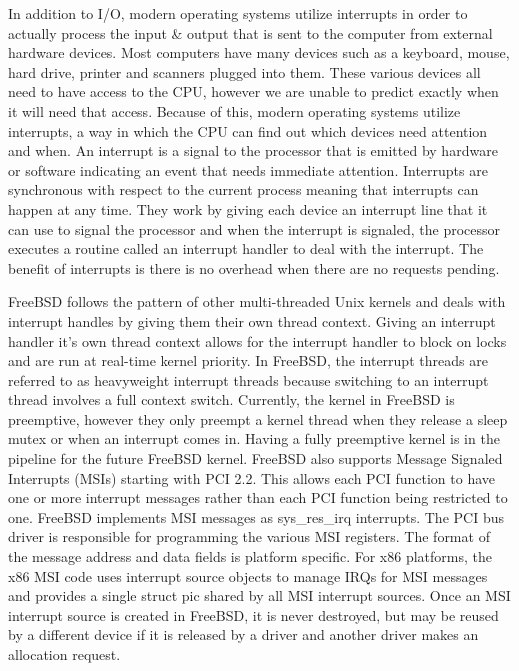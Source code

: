 \documentclass[letterpaper,10pt,draftclsnofoot,onecolumn,titlepage]{IEEEtran}
\begin{document}
	In addition to I/O, modern operating systems utilize interrupts in order to actually process the input \& output that is sent to the computer from external hardware devices.
	Most computers have many devices such as a keyboard, mouse, hard drive, printer and scanners plugged into them.
	These various devices all need to have access to the CPU, however we are unable to predict exactly when it will need that access.
	Because of this, modern operating systems utilize interrupts, a way in which the CPU can find out which devices need attention and when.
	An interrupt is a signal to the processor that is emitted by hardware or software indicating an event that needs immediate attention.
	Interrupts are synchronous with respect to the current process meaning that interrupts can happen at any time.
	They work by giving each device an interrupt line that it can use to signal the processor and when the interrupt is signaled, the processor executes a routine called an interrupt handler to deal with the interrupt.
	The benefit of interrupts is there is no overhead when there are no requests pending.

	FreeBSD follows the pattern of other multi-threaded Unix kernels and deals with interrupt handles by giving them their own thread context.
	Giving an interrupt handler it's own thread context allows for the interrupt handler to block on locks and are run at real-time kernel priority.
	In FreeBSD, the interrupt threads are referred to as heavyweight interrupt threads because switching to an interrupt thread involves a full context switch.
	Currently, the kernel in FreeBSD is preemptive, however they only preempt a kernel thread when they release a sleep mutex or when an interrupt comes in.
	Having a fully preemptive kernel is in the pipeline for the future FreeBSD kernel.
	FreeBSD also supports Message Signaled Interrupts (MSIs) starting with PCI 2.2. This allows each PCI function to have one or more interrupt messages rather than each PCI function being restricted to one.
	FreeBSD implements MSI messages as sys\_res\_irq interrupts. The PCI bus driver is responsible for programming the various MSI registers.
	The format of the message address and data fields is platform specific.
	For x86 platforms, the x86 MSI code uses interrupt source objects to manage IRQs for MSI messages and provides a single struct pic shared by all MSI interrupt sources.
	Once an MSI interrupt source is created in FreeBSD, it is never destroyed, but may be reused by a different device if it is released by a driver and another driver makes an allocation request.
\end{document}
